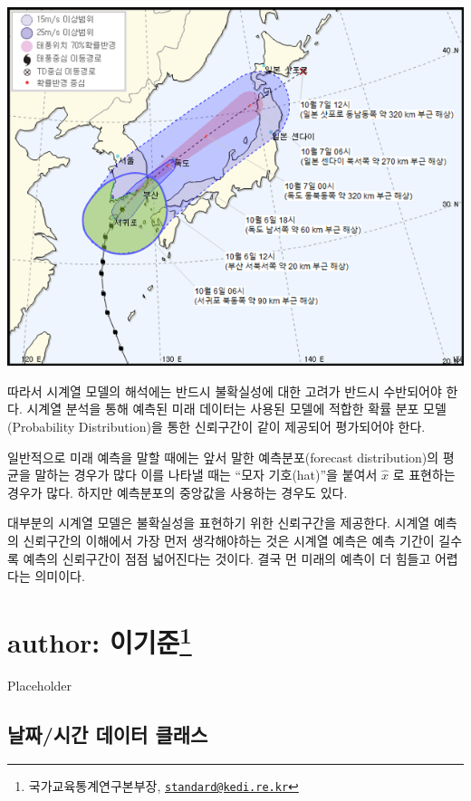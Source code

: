 \documentclass[
]{book}
\begin{document}
\includegraphics{img_typoon_2020_2.png}

따라서 시계열 모델의 해석에는 반드시 불확실성에 대한 고려가 반드시 수반되어야 한다. 시계열 분석을 통해 예측된 미래 데이터는 사용된 모델에 적합한 확률 분포 모델(Probability Distribution)을 통한 신뢰구간이 같이 제공되어 평가되어야 한다.

일반적으로 미래 예측을 말할 때에는 앞서 말한 예측분포(forecast distribution)의 평균을 말하는 경우가 많다 이를 나타낼 때는 ``모자 기호(hat)''을 붙여서 \(\hat{x}\) 로 표현하는 경우가 많다. 하지만 예측분포의 중앙값을 사용하는 경우도 있다.

대부분의 시계열 모델은 불확실성을 표현하기 위한 신뢰구간을 제공한다. 시계열 예측의 신뢰구간의 이해에서 가장 먼저 생각해야하는 것은 시계열 예측은 예측 기간이 길수록 예측의 신뢰구간이 점점 넓어진다는 것이다. 결국 먼 미래의 예측이 더 힘들고 어렵다는 의미이다.

\hypertarget{author-uxc774uxae30uxc900}{%
\chapter[author: 이기준]{\texorpdfstring{author: 이기준\footnote{국가교육통계연구본부장, \href{mailto:standard@kedi.re.kr}{\nolinkurl{standard@kedi.re.kr}}}}{author: 이기준}}\label{author-uxc774uxae30uxc900}}

Placeholder

\hypertarget{uxb0a0uxc9dcuxc2dcuxac04-uxb370uxc774uxd130-uxd074uxb798uxc2a4}{%
\section{날짜/시간 데이터 클래스}\label{uxb0a0uxc9dcuxc2dcuxac04-uxb370uxc774uxd130-uxd074uxb798uxc2a4}}
\end{document}
